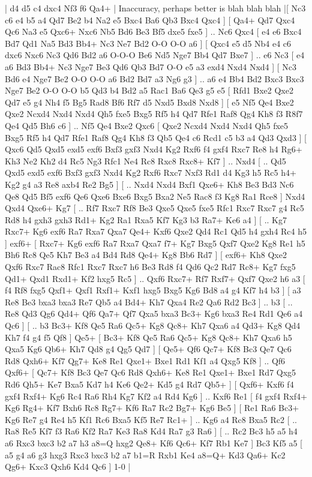 \makegametitle 
|   d4   d5    c4   dxc4    Nf3   f6    Qa4+ |  Inaccuracy, perhaps better is blah blah blah |[  Nc3 c6  e4 b5  a4 Qd7  Be2 b4  Na2 e5  Bxc4 Ba6  Qb3 Bxc4  Qxc4   ]  [  Qa4+ Qd7  Qxc4 Qc6  Na3 e5  Qxc6+ Nxc6  Nb5 Bd6  Be3 Bf5  dxe5 fxe5   ] .. Nc6    Qxc4 [  e4 e6  Bxc4 Bd7  Qd1 Na5  Bd3 Bb4+  Nc3 Ne7  Bd2 O-O  O-O a6   ]  [  Qxc4 e5  d5 Nb4  e4 c6  dxc6 Nxc6  Nc3 Qd6  Bd2 a6  O-O-O Be6  Nd5 Nge7  Bb4 Qd7  Bxe7   ] .. e6    Nc3 [  e4 a6  Bd3 Bb4+  Nc3 Nge7  Be3 Qd6  Qb3 Bd7  O-O e5  a3 exd4  Nxd4 Nxd4   ]  [  Nc3 Bd6  e4 Nge7  Be2 O-O  O-O a6  Bd2 Bd7  a3 Ng6  g3   ] .. a6    e4   Bb4    Bd2   Bxc3    Bxc3   Nge7    Be2   O-O    O-O   b5    Qd3   b4    Bd2   a5    Rac1   Ba6    Qe3   g5    e5 [  Rfd1 Bxe2  Qxe2 Qd7  e5 g4  Nh4 f5  Bg5 Rad8  Bf6 Rf7  d5 Nxd5  Bxd8 Nxd8   ]  [  e5 Nf5  Qe4 Bxe2  Qxe2 Ncxd4  Nxd4 Nxd4  Qh5 fxe5  Bxg5 Rf5  h4 Qd7  Rfe1 Raf8  Qg4 Kh8  f3 R8f7  Qe4 Qd5  Bh6 c6   ] .. Nf5    Qe4   Bxe2    Qxc6 [  Qxe2 Ncxd4  Nxd4 Nxd4  Qh5 fxe5  Bxg5 Rf5  h4 Qd7  Rfe1 Raf8  Qg4 Kh8  f3 Qb5  Qe4 c6  Rcd1 c5  b3 a4  Qd3 Qxd3   ]  [  Qxc6 Qd5  Qxd5 exd5  exf6 Bxf3  gxf3 Nxd4  Kg2 Rxf6  f4 gxf4  Rxc7 Re8  h4 Rg6+  Kh3 Ne2  Kh2 d4  Rc5 Ng3  Rfc1 Ne4  Rc8 Rxc8  Rxc8+ Kf7   ] .. Nxd4 [ .. Qd5  Qxd5 exd5  exf6 Bxf3  gxf3 Nxd4  Kg2 Rxf6  Rxc7 Nxf3  Rd1 d4  Kg3 h5  Rc5 h4+  Kg2 g4  a3 Re8  axb4 Re2  Bg5   ]  [ .. Nxd4  Nxd4 Bxf1  Qxe6+ Kh8  Be3 Bd3  Nc6 Qe8  Qd5 Bf5  exf6 Qe6  Qxe6 Bxe6  Bxg5 Bxa2  Ne5 Rac8  f3 Kg8  Ra1 Rce8   ]  Nxd4   Qxd4    Qxe6+   Kg7 [ .. Rf7  Rxc7 Rf8  Be3 Qxe5  Qxe5 fxe5  Rfc1 Rxc7  Rxc7 g4  Rc5 Rd8  h4 gxh3  gxh3 Rd1+  Kg2 Ra1  Rxa5 Kf7  Kg3 b3  Ra7+ Ke6  a4   ]  [ .. Kg7  Rxc7+ Kg6  exf6 Ra7  Rxa7 Qxa7  Qe4+ Kxf6  Qxe2 Qd4  Rc1 Qd5  h4 gxh4  Rc4 h5   ]  exf6+ [  Rxc7+ Kg6  exf6 Ra7  Rxa7 Qxa7  f7+ Kg7  Bxg5 Qxf7  Qxe2 Kg8  Re1 h5  Bh6 Rc8  Qe5 Kh7  Be3 a4  Bd4 Rd8  Qe4+ Kg8  Bb6 Rd7   ]  [  exf6+ Kh8  Qxe2 Qxf6  Rxc7 Rac8  Rfc1 Rxc7  Rxc7 h6  Be3 Rd8  f4 Qd6  Qc2 Rd7  Rc8+ Kg7  fxg5 Qd1+  Qxd1 Rxd1+  Kf2 hxg5  Rc5   ] .. Qxf6    Rxc7+   Rf7    Rxf7+   Qxf7    Qxe2   h6    a3 [  f4 Rf8  fxg5 Qxf1+  Qxf1 Rxf1+  Kxf1 hxg5  Bxg5 Kg6  Bd8 a4  g4 Kf7  h4 b3   ]  [  a3 Re8  Be3 bxa3  bxa3 Re7  Qb5 a4  Bd4+ Kh7  Qxa4 Re2  Qa6 Rd2  Bc3   ] .. b3 [ .. Re8  Qd3 Qg6  Qd4+ Qf6  Qa7+ Qf7  Qxa5 bxa3  Bc3+ Kg6  bxa3 Re4  Rd1 Qe6  a4 Qc6   ]  [ .. b3  Bc3+ Kf8  Qe5 Ra6  Qc5+ Kg8  Qc8+ Kh7  Qxa6 a4  Qd3+ Kg8  Qd4 Kh7  f4 g4  f5 Qf8   ]  Qe5+ [  Bc3+ Kf8  Qe5 Ra6  Qc5+ Kg8  Qc8+ Kh7  Qxa6 h5  Qxa5 Kg6  Qb6+ Kh7  Qd8 g4  Qg5 Qd7   ]  [  Qe5+ Qf6  Qc7+ Kf8  Bc3 Qe7  Qc6 Rd8  Qxh6+ Kf7  Qg7+ Ke8  Re1 Qxe1+  Bxe1 Rd1  Kf1 a4  Qxg5 Kf8   ] .. Qf6    Qxf6+ [  Qc7+ Kf8  Bc3 Qe7  Qc6 Rd8  Qxh6+ Ke8  Re1 Qxe1+  Bxe1 Rd7  Qxg5 Rd6  Qh5+ Ke7  Bxa5 Kd7  h4 Ke6  Qe2+ Kd5  g4 Rd7  Qb5+   ]  [  Qxf6+ Kxf6  f4 gxf4  Rxf4+ Kg6  Rc4 Ra6  Rh4 Kg7  Kf2 a4  Rd4 Kg6   ] .. Kxf6    Re1 [  f4 gxf4  Rxf4+ Kg6  Rg4+ Kf7  Bxh6 Rc8  Rg7+ Kf6  Ra7 Rc2  Bg7+ Kg6  Be5   ]  [  Re1 Ra6  Bc3+ Kg6  Re7 g4  Re4 h5  Kf1 Rc6  Bxa5 Kf5  Re7 Rc1+   ] .. Kg6    a4   Rc8    Bxa5   Rc2 [ .. Ra8  Re5 Kf7  f3 Ra6  Kf2 Ra7  Ke3 Ra8  Kd4 Ra7  g3 Ra6   ]  [ .. Rc2  Bc3 h5  a5 h4  a6 Rxc3  bxc3 b2  a7 h3  a8=Q hxg2  Qe8+ Kf6  Qc6+ Kf7  Rb1 Ke7   ]  Bc3   Kf5    a5    [  a5 g4  a6 g3  hxg3 Rxc3  bxc3 b2  a7 b1=R  Rxb1 Ke4  a8=Q+ Kd3  Qa6+ Kc2  Qg6+ Kxc3  Qxh6 Kd4  Qc6   ] 1-0  |
